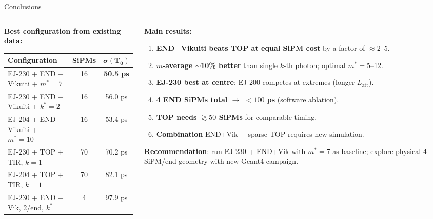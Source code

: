 \documentclass[xcolor=table,aspectratio=169,9pt]{beamer}
\begin{document}
\begin{frame}{Conclusions}
\begin{columns}[T]
\begin{column}{0.52\textwidth}
\textbf{Best configuration from existing data:}\\[0.3em]
\footnotesize
\begin{tabular}{lcc}
\toprule
\textbf{Configuration} & \textbf{SiPMs} & $\boldsymbol{\sigma(T_0)}$\\
\midrule
\rowcolor{rowbest}
EJ-230 + END + Vikuiti + $m^*{=}7$ & 16 & \textbf{50.5 ps}\\
EJ-230 + END + Vikuiti + $k^*{=}2$ & 16 & 56.0 ps\\
EJ-204 + END + Vikuiti + $m^*{=}10$& 16 & 53.4 ps\\
EJ-230 + TOP + TIR, $k{=}1$        & 70 & 70.2 ps\\
EJ-204 + TOP + TIR, $k{=}1$        & 70 & 82.1 ps\\
EJ-230 + END + Vik, 2/end, $k^*$   & 4  & 97.9 ps\\
\bottomrule
\end{tabular}
\end{column}
\begin{column}{0.44\textwidth}
\textbf{Main results:}\\[0.3em]
\begin{enumerate}\footnotesize
  \item \textbf{END+Vikuiti beats TOP at equal SiPM cost} by a factor of $\approx$2--5.
  \item \textbf{$m$-average $\sim$10\% better} than single $k$-th photon; optimal $m^*=5$--12.
  \item \textbf{EJ-230 best at centre}; EJ-200 competes at extremes (longer $L_\mathrm{att}$).
  \item \textbf{4 END SiPMs total $\to$ $<100$ ps} (software ablation).
  \item \textbf{TOP needs $\gtrsim50$ SiPMs} for comparable timing.
  \item \textbf{Combination} END+Vik + sparse TOP requires new simulation.
\end{enumerate}
\vspace{0.3em}
\normalsize
\textbf{Recommendation}: run EJ-230 + END+Vik with $m^*=7$ as baseline; explore physical 4-SiPM/end geometry with new Geant4 campaign.
\end{column}
\end{columns}
\end{frame}
\end{document}
